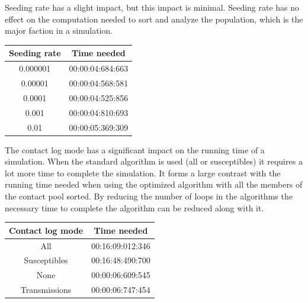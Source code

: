 \documentclass[runningheads]{llncs}
\begin{document}
\noindent
Seeding rate has a slight impact, but this impact is minimal. Seeding rate has no effect on the computation needed to sort and analyze the population, which is the major faction in a simulation.
\begin{center}
	\begin{tabular}{ | c | c |}
		\hline
		Seeding rate & Time needed \\ \hline
		0.000001 & 00:00:04:684:663 \\ \hline
		0.00001 & 00:00:04:568:581 \\ \hline
		0.0001 & 00:00:04:525:856 \\ \hline
		0.001 & 00:00:04:810:693 \\ \hline
		0.01 & 00:00:05:369:309 \\
		\hline	
	\end{tabular}
\end{center} 
\noindent

The contact log mode has a significant impact on the running time of a simulation. When the standard algorithm is used (all or susceptibles) it requires a lot more time to complete the simulation. It forms a large contrast with the running time needed when using the optimized algorithm with all the members of the contact pool sorted. By reducing the number of loops in the algorithms the necessary time to complete the algorithm can be reduced along with it.
\begin{center}
	\begin{tabular}{ | c | c |}
		\hline
		Contact log mode & Time needed \\ \hline
		All & 00:16:09:012:346 \\ \hline
		Susceptibles & 00:16:48:490:700 \\ \hline
		None & 00:00:06:609:545 \\ \hline
		Transmissions & 00:00:06:747:454 \\
		\hline	
	\end{tabular}
\end{center}
\end{document}
